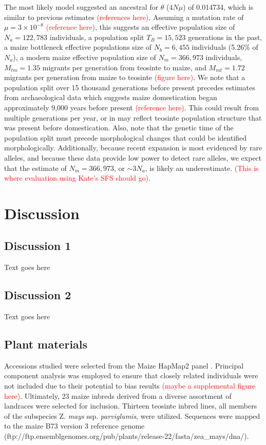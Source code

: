 \documentclass{pnastwo}
\begin{document}
\begin{article}
The most likely model suggested an ancestral for $\theta$ ($4N\mu$) of
0.014734, which is similar to previous estimates
\textcolor{red}{(references here)}. Assuming a mutation rate of $\mu =
3 \times 10^{-8}$ \textcolor{red}{(reference here)}, this suggests an effective
population size of $N_a = 122,783$ individuals, a population split
$T_B = 15,523$ generations in the past, a maize bottleneck
effective populations size of $N_b = 6,455$ individuals (5.26\% of
$N_a$), a modern maize effective population size of $N_m = 366,973$
individuals, $M_{tm} = 1.35$ migrants per generation from teosinte to
maize, and $M_{mt} = 1.72$ migrants per generation from maize to
teosinte \textcolor{red}{(figure here)}. We note that a population
split over 15 thousand generations before present precedes estimates
from 
archaeological data which suggests maize domestication began
approximately 9,000 years before present \textcolor{red}{(reference
  here)}. This could result from multiple generations per year, or in
may reflect teosinte population structure that was present before
domestication. Also, note that the genetic time of the population
split must precede morphological changes that could be identified
morphologically.   Additionally, because recent expansion is
most evidenced by rare alleles, and because these data provide low
power to detect rare alleles, we expect that the estimate of  $N_m =
366,973$, or $\sim 3N_a$, is likely an underestimate. \textcolor{red}{(This
  is where evaluation using Kate's SFS should go)}.


\section{Discussion}
\subsection{Discussion 1}
Text goes here

\subsection{Discussion 2}
Text goes here

\begin{materials}
\subsection{Plant materials}
Accessions studied were selected from the Maize HapMap2
panel \cite{hapmap2} . Principal component analysis was employed to ensure that
closely related individuals were not included due to their potential
to bias results \textcolor{red}{(maybe a supplemental figure here)}. Ultimately, 23 maize inbreds derived from a diverse
assortment of landraces were selected for inclusion. Thirteen teosinte
inbred lines, all members of the subspecies Z. \emph{mays}
ssp. \emph{parviglumis}, were utilized. Sequences were mapped to the
maize B73 version 3 reference genome \cite{maizeGenome}
(ftp://ftp.ensemblgenomes.org/pub/plants/release-22/fasta/zea\_mays/dna/).


\end{materials}
\end{article}
\end{document}
